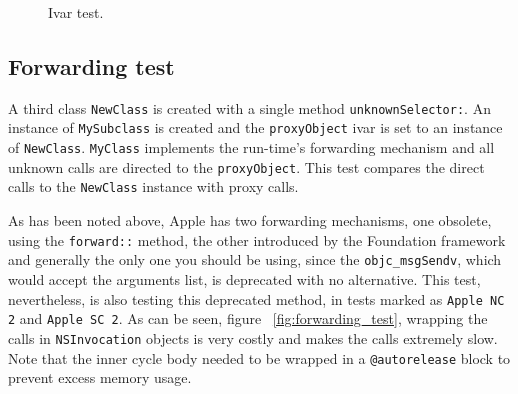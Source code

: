 \begin{figure}[H]
  \centering{}
  \caption{Ivar test.}
  \label{fig:ivar_test}
\end{figure}


\subsection{Forwarding test}

A third class \verb=NewClass= is created with a single method \verb=unknownSelector:=. An instance of \verb=MySubclass= is created and the \verb=proxyObject= ivar is set to an instance of \verb=NewClass=. \verb=MyClass= implements the run-time's forwarding mechanism and all unknown calls are directed to the \verb=proxyObject=. This test compares the direct calls to the \verb=NewClass= instance with proxy calls.

As has been noted above, Apple has two forwarding mechanisms, one obsolete, using the \verb=forward::= method, the other introduced by the Foundation framework and generally the only one you should be using, since the \verb=objc_msgSendv=, which would accept the arguments list, is deprecated with no alternative. This test, nevertheless, is also testing this deprecated method, in tests marked as \verb=Apple NC 2= and \verb=Apple SC 2=. As can be seen, figure ~\ref{fig:forwarding_test}, wrapping the calls in \verb=NSInvocation= objects is very costly and makes the calls extremely slow. Note that the inner cycle body needed to be wrapped in a \verb=@autorelease= block to prevent excess memory usage.

